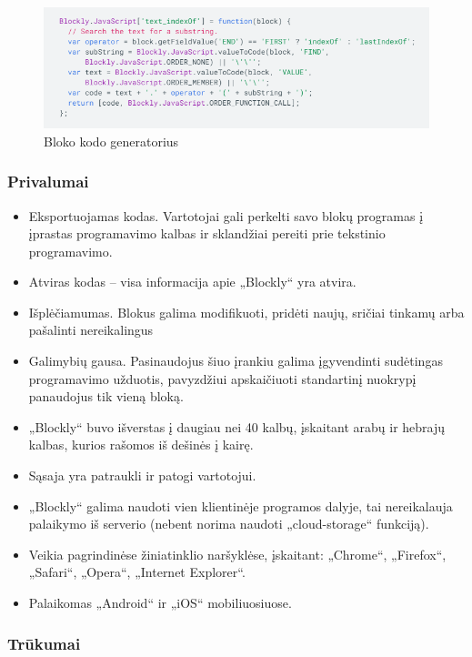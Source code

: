 \documentclass{VUMIFPSkursinis}
\begin{document}
\begin{figure}[H]
    \centering
    \includegraphics[scale=0.6]{img/generatingCode.png}
    \caption{Bloko kodo generatorius}
    \label{img:generatingCode}
\end{figure}

\subsubsection{Privalumai}

\begin{itemize}
    \item Eksportuojamas kodas. Vartotojai gali perkelti savo blokų programas į įprastas programavimo kalbas ir sklandžiai pereiti prie tekstinio programavimo.
    \item Atviras kodas -- visa informacija apie „Blockly“ yra atvira.
    \item Išplėčiamumas. Blokus galima modifikuoti, pridėti naujų, sričiai tinkamų arba pašalinti nereikalingus
    \item Galimybių gausa. Pasinaudojus šiuo įrankiu galima įgyvendinti sudėtingas programavimo užduotis, pavyzdžiui apskaičiuoti standartinį nuokrypį panaudojus tik vieną bloką.
    \item „Blockly“ buvo išverstas į daugiau nei 40 kalbų, įskaitant arabų ir hebrajų kalbas, kurios rašomos iš dešinės į kairę. \cite{introductionToBlockly}
    \item Sąsaja yra patraukli ir patogi vartotojui.
    \item „Blockly“ galima naudoti vien klientinėje programos dalyje, tai nereikalauja palaikymo iš serverio (nebent norima naudoti „cloud-storage“ funkciją).
    \item Veikia pagrindinėse žiniatinklio naršyklėse, įskaitant: „Chrome“, „Firefox“, „Safari“, „Opera“, „Internet Explorer“.
    \item Palaikomas „Android“ ir „iOS“ mobiliuosiuose.
\end{itemize}

\subsubsection{Trūkumai}
\end{document}
